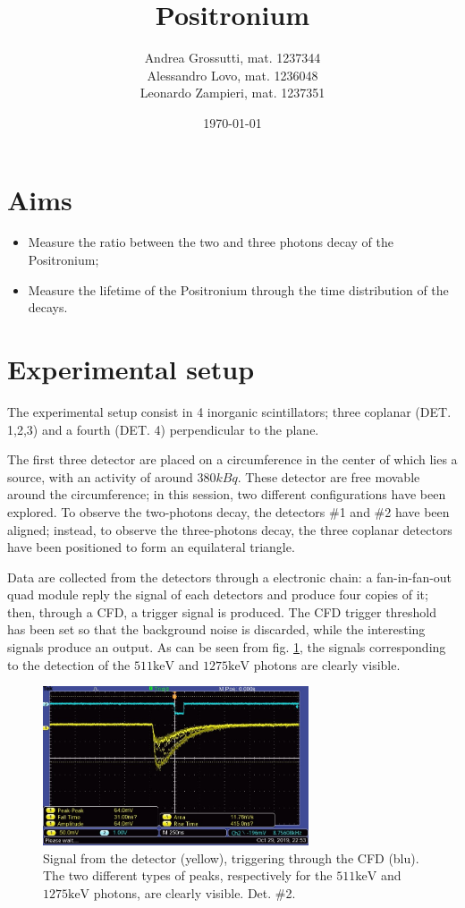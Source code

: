 \documentclass[11pt,a4 paper]{article}
\title{Positronium}
\author{Andrea Grossutti, mat. 1237344\\Alessandro Lovo, mat. 1236048\\Leonardo Zampieri, mat. 1237351}
\date{\today}
\begin{document}
\maketitle

\section{Aims}
\begin{itemize}
    \item Measure the ratio between the two and three photons decay of the Positronium;
    \item Measure the lifetime of the Positronium through the time distribution of the decays.
\end{itemize}

\section{Experimental setup}
The experimental setup consist in 4 inorganic scintillators; three coplanar (DET. 1,2,3) and a fourth (DET. 4) perpendicular to the plane.

The first three detector are placed on a circumference in the center of which lies a  source, with an activity of around $380\si{kBq}$. These detector are free movable around the circumference; in this session, two different configurations have been explored. To observe the two-photons decay, the detectors \#1 and \#2 have been aligned; instead, to observe the three-photons decay, the three coplanar detectors have been positioned to form an equilateral triangle.

Data are collected from the detectors through a electronic chain: a fan-in-fan-out quad module reply the signal of each detectors and produce four copies of it; then, through a CFD, a trigger signal is produced.  The CFD trigger threshold has been set so that the background noise is discarded, while the interesting signals produce an output. As can be seen from fig. \ref{fig:oscilloscope}, the signals corresponding to the detection of the $511\si{\kilo\electronvolt}$ and $1275\si{\kilo\electronvolt}$ photons are clearly visible.

\begin{figure}[H]
    \centering
    \includegraphics[width=0.7\textwidth]{img/TEK0001.JPG}
    \caption{Signal from the detector (yellow), triggering through the CFD (blu). The two different types of peaks, respectively for the $511\si{\kilo\electronvolt}$ and $1275\si{\kilo\electronvolt}$ photons, are clearly visible. Det. \#2.}
    \label{fig:oscilloscope}
\end{figure}
\end{document}
